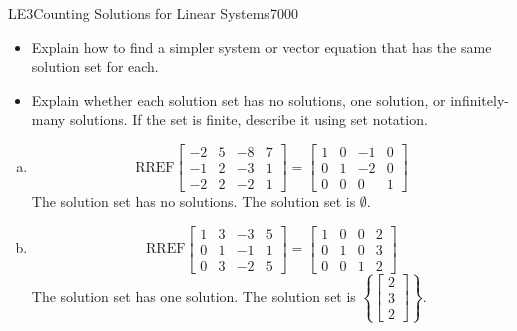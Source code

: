 \begin{exercise}{LE3}{Counting Solutions for Linear Systems}{7000}
\begin{exerciseStatement}
\begin{enumerate}[(a)]
 
\end{enumerate}

     

\begin{itemize}
\item  

 Explain how to find a simpler system or vector equation that has the same solution set for each. 

 
\item  

 Explain whether each solution set has no solutions, one solution, or infinitely-many solutions. If the set is finite, describe it using set notation. 

 
\end{itemize}

     \end{exerciseStatement}
 \begin{exerciseAnswer} 

\begin{enumerate}[(a)]
\item  

 \[\mathrm{RREF}\left[\begin{array}{ccc|c}
-2 & 5 & -8 & 7 \\
-1 & 2 & -3 & 1 \\
-2 & 2 & -2 & 1
\end{array}\right]=\left[\begin{array}{ccc|c}
1 & 0 & -1 & 0 \\
0 & 1 & -2 & 0 \\
0 & 0 & 0 & 1
\end{array}\right]\] The solution set has no solutions. The solution set is \(\emptyset\). 

 
\item  

 \[\mathrm{RREF}\left[\begin{array}{ccc|c}
1 & 3 & -3 & 5 \\
0 & 1 & -1 & 1 \\
0 & 3 & -2 & 5
\end{array}\right]=\left[\begin{array}{ccc|c}
1 & 0 & 0 & 2 \\
0 & 1 & 0 & 3 \\
0 & 0 & 1 & 2
\end{array}\right]\] The solution set has one solution. The solution set is \(\left\{ \left[\begin{array}{c}
2 \\
3 \\
2
\end{array}\right] \right\}\). 


\end{enumerate}
\end{exerciseAnswer}
\end{exercise}
